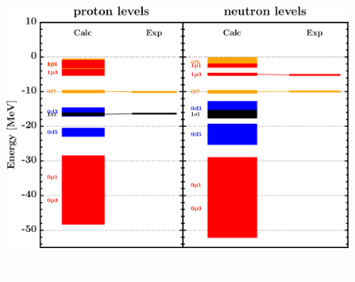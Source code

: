\documentclass[twocolumn,secnumarabic,amssymb, nobibnotes, aps, prl,
superscriptaddress, nobalancelastpage]{revtex4}
\begin{document}
\begin{figure}[!htb]
\begin{minipage}{0.4\linewidth}
        \label{DOM_ca48_chargeDensity}
    \end{minipage}
    \begin{minipage}{0.35\linewidth}
        \centering
        \includegraphics[width=\linewidth]{figures/ca48_SPLevels.png}
        \label{DOM_ca48_SPLevels}
    \end{minipage}
    \begin{minipage}{0.4\linewidth}
        \centering
        \includegraphics[width=\linewidth]{figures/ca48_RMSRadius.png}

\end{minipage}
\end{figure}
\end{document}
